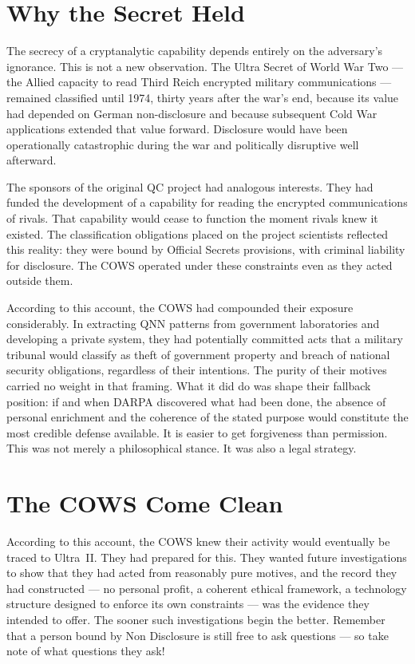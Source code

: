 \section*{Why the Secret Held}
\label{pos26:why-the-secret-held}

The secrecy of a cryptanalytic capability depends entirely on the adversary's ignorance. This is not a new observation. The Ultra Secret of World War Two --- the Allied capacity to read Third Reich encrypted military communications --- remained classified until 1974, thirty years after the war's end, because its value had depended on German non-disclosure and because subsequent Cold War applications extended that value forward. Disclosure would have been operationally catastrophic during the war and politically disruptive well afterward.

The sponsors of the original QC project had analogous interests. They had funded the development of a capability for reading the encrypted communications of rivals. That capability would cease to function the moment rivals knew it existed. The classification obligations placed on the project scientists reflected this reality: they were bound by Official Secrets provisions, with criminal liability for disclosure. The COWS operated under these constraints even as they acted outside them.

According to this account, the COWS had compounded their exposure considerably. In extracting QNN patterns from government laboratories and developing a private system, they had potentially committed acts that a military tribunal would classify as theft of government property and breach of national security obligations, regardless of their intentions. The purity of their motives carried no weight in that framing. What it did do was shape their fallback position: if and when DARPA discovered what had been done, the absence of personal enrichment and the coherence of the stated purpose would constitute the most credible defense available. It is easier to get forgiveness than permission. This was not merely a philosophical stance. It was also a legal strategy.

\section*{The COWS Come Clean}
\label{pos26:the-cows-come-clean}

According to this account, the COWS knew their activity would eventually be traced to Ultra~II\@. They had prepared for this. They wanted future investigations to show that they had acted from reasonably pure motives, and the record they had constructed --- no personal profit, a coherent ethical framework, a technology structure designed to enforce its own constraints --- was the evidence they intended to offer. The sooner such investigations begin the better. Remember that a person bound by Non Disclosure is still free to ask questions --- so take note of what questions they ask!

